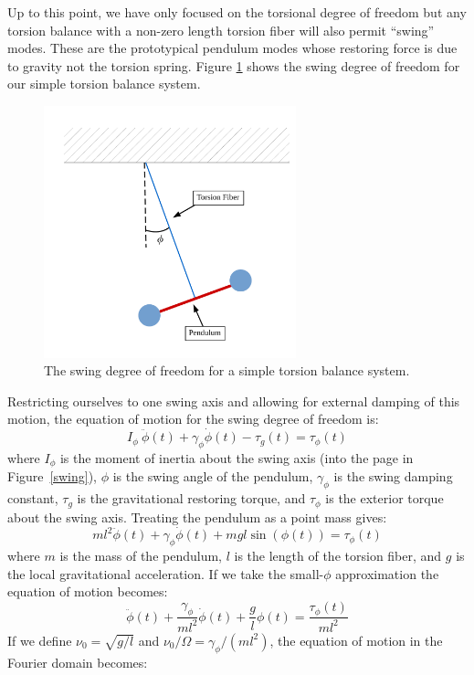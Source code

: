 \documentclass{book}
\begin{document}
\quad Up to this point, we have only focused on the torsional degree of freedom but any torsion balance with a non-zero length torsion fiber will also permit ``swing'' modes. These are the prototypical pendulum modes whose restoring force is due to gravity not the torsion spring. Figure \ref{swingFig} shows the swing degree of freedom for our simple torsion balance system.

\begin{figure}[!h]
\begin{centering}
\includegraphics[width=0.65\textwidth]{Swing.pdf}
\caption{The swing degree of freedom for a simple torsion balance system.}\label{swingFig}
\end{centering}
\end{figure}

Restricting ourselves to one swing axis and allowing for external damping of this motion, the equation of motion for the swing degree of freedom is:
\begin{equation}
I_\phi\ \ddot{\phi}(t)+\gamma_\phi \dot{\phi}(t) - \tau_g(t)=\tau_\phi(t)
\end{equation}
where $I_\phi$ is the moment of inertia about the swing axis (into the page in Figure~\ref{swing}), $\phi$ is the swing angle of the pendulum, $\gamma_\phi$ is the swing damping constant, $\tau_g$ is the gravitational restoring torque, and $\tau_\phi$ is the exterior torque about the swing axis. Treating the pendulum as a point mass gives:
\begin{equation}
m l^2 \ddot{\phi}(t)+\gamma_\phi \dot{\phi}(t)+m g l \sin(\phi(t))=\tau_\phi(t)
\end{equation}
where $m$ is the mass of the pendulum, $l$ is the length of the torsion fiber, and $g$ is the local gravitational acceleration. If we take the small-$\phi$ approximation the equation of motion becomes:
\begin{equation}
\ddot{\phi}(t)+\frac{\gamma_\phi}{m l^2} \dot{\phi}(t)+\frac{g}{l} \phi(t)=\frac{\tau_\phi(t)}{m l^2}
\end{equation}
If we define $\nu_0=\sqrt{g/l}$ and $\nu_0/\Omega=\gamma_\phi/(m l^2)$, the equation of motion in the Fourier domain becomes:
\end{document}
